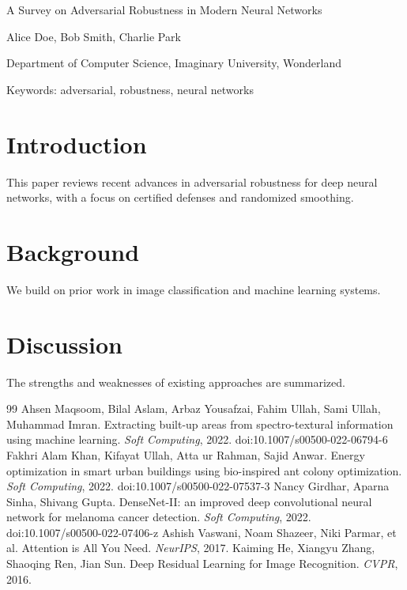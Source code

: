 
A Survey on Adversarial Robustness in Modern Neural Networks

Alice Doe, Bob Smith, Charlie Park

Department of Computer Science, Imaginary University, Wonderland

Keywords: adversarial, robustness, neural networks

\section{Introduction}
This paper reviews recent advances in adversarial robustness for deep neural
networks, with a focus on certified defenses and randomized smoothing.

\section{Background}
We build on prior work in image classification and machine learning systems.

\section{Discussion}
The strengths and weaknesses of existing approaches are summarized.

\begin{thebibliography}{99}
 Ahsen Maqsoom, Bilal Aslam, Arbaz Yousafzai, Fahim Ullah, Sami Ullah, Muhammad Imran. Extracting built-up areas from spectro-textural information using machine learning. \emph{Soft Computing}, 2022. doi:10.1007/s00500-022-06794-6
 Fakhri Alam Khan, Kifayat Ullah, Atta ur Rahman, Sajid Anwar. Energy optimization in smart urban buildings using bio-inspired ant colony optimization. \emph{Soft Computing}, 2022. doi:10.1007/s00500-022-07537-3
 Nancy Girdhar, Aparna Sinha, Shivang Gupta. DenseNet-II: an improved deep convolutional neural network for melanoma cancer detection. \emph{Soft Computing}, 2022. doi:10.1007/s00500-022-07406-z
 Ashish Vaswani, Noam Shazeer, Niki Parmar, et al. Attention is All You Need. \emph{NeurIPS}, 2017.
 Kaiming He, Xiangyu Zhang, Shaoqing Ren, Jian Sun. Deep Residual Learning for Image Recognition. \emph{CVPR}, 2016.
\end{thebibliography}
